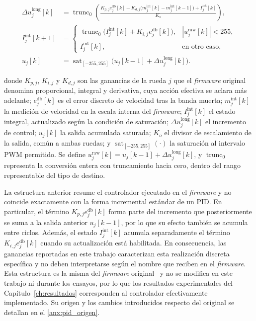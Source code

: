 \begin{align}
\Delta u_j^{\mathrm{long}}[k]
&=
\operatorname{trunc}_0\!\left(
\frac{
K_{p,j}e_j^{\mathrm{db}}[k]
-
K_{d,j}\bigl(m_j^{\mathrm{int}}[k]-m_j^{\mathrm{int}}[k-1]\bigr)
+
I_j^{\mathrm{int}}[k]
}{
K_o
}\right),
\label{eq:pid_fw_incremento}\\
I_j^{\mathrm{int}}[k+1]
&=
\begin{cases}
\operatorname{trunc}_0\!\bigl(I_j^{\mathrm{int}}[k]+K_{i,j}e_j^{\mathrm{db}}[k]\bigr),
& |u_j^{\mathrm{raw}}[k]|<255,\\
I_j^{\mathrm{int}}[k], & \text{en otro caso},
\end{cases}
\label{eq:pid_fw_integrador}\\
u_j[k]
&=
\operatorname{sat}_{[-255,255]}
\bigl(u_j[k-1]+\Delta u_j^{\mathrm{long}}[k]\bigr).
\label{eq:pid_fw_salida}
\end{align}

\noindent donde $K_{p,j}$, $K_{i,j}$ y $K_{d,j}$ son las ganancias de la rueda $j$
que el \textit{firmware} original denomina proporcional, integral y derivativa, cuya
acción efectiva se aclara más adelante; $e_j^{\mathrm{db}}[k]$ es el
error discreto de velocidad tras la banda muerta; $m_j^{\mathrm{int}}[k]$ la
medición de velocidad en la escala interna del \textit{firmware}; $I_j^{\mathrm{int}}[k]$
el estado integral, actualizado según la condición de saturación;
$\Delta u_j^{\mathrm{long}}[k]$ el incremento de control; $u_j[k]$ la salida
acumulada saturada; $K_o$ el divisor de escalamiento de la salida, común a ambas
ruedas; y $\operatorname{sat}_{[-255,255]}(\cdot)$ la saturación al intervalo PWM
permitido. Se define $u_j^{\mathrm{raw}}[k]=u_j[k-1]+\Delta
u_j^{\mathrm{long}}[k]$, y $\operatorname{trunc}_0$ representa la conversión
entera con truncamiento hacia cero, dentro del rango representable del tipo
de destino.

La estructura anterior resume el controlador ejecutado en el
\textit{firmware} y no coincide exactamente con la forma incremental estándar de un PID. En
particular, el término $K_{p,j}e_j^{\mathrm{db}}[k]$ forma parte del incremento
que posteriormente se suma a la salida anterior $u_j[k-1]$, por lo que su
efecto también se acumula entre ciclos. Además, el estado
$I_j^{\mathrm{int}}[k]$ acumula separadamente el término
$K_{i,j}e_j^{\mathrm{db}}[k]$ cuando su actualización está habilitada. En consecuencia, las ganancias reportadas en
este trabajo caracterizan esta realización discreta específica y no deben
interpretarse según el nombre que reciben en el \textit{firmware}. Esta estructura
es la misma del \textit{firmware} original~\citep{newans_rosarduinobridge,hbrobotics_rosarduinobridge}
y no se modifica en este trabajo ni durante los ensayos, por lo que los
resultados experimentales del Capítulo~\ref{ch:resultados} corresponden al
controlador efectivamente implementado. Su origen y los cambios introducidos
respecto del original se detallan en el \ref{anx:pid_origen}.

